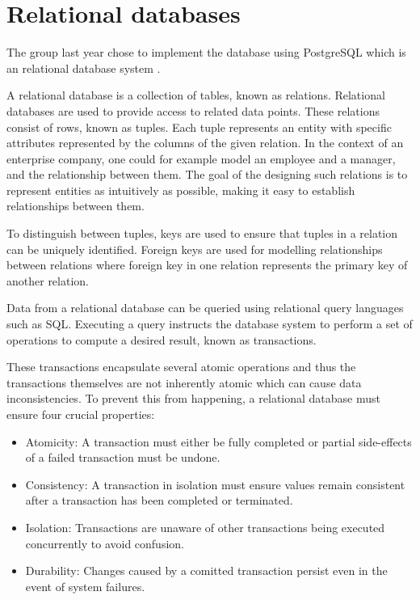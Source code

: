 \section{Relational databases}
The group last year chose to implement the database using PostgreSQL which is an relational database system .

A relational database is a collection of tables, known as relations. Relational databases are used to provide access to related data points.
These relations consist of rows, known as tuples. Each tuple represents an entity with specific attributes represented by the columns of the given relation.
In the context of an enterprise company, one could for example model an employee and a manager, and the relationship between them.
The goal of the designing such relations is to represent entities as intuitively as possible, making it easy to establish relationships between them. 

To distinguish between tuples, keys are used to ensure that tuples in a relation can be uniquely identified.
Foreign keys are used for modelling relationships between relations where foreign key in one relation represents the primary key of another relation.

Data from a relational database can be queried using relational query languages such as SQL.
Executing a query instructs the database system to perform a set of operations to compute a desired result, known as transactions.

These transactions encapsulate several atomic operations and thus the transactions themselves are not inherently atomic which can cause data inconsistencies. 
To prevent this from happening, a relational database must ensure four crucial properties:
\begin{itemize}
    \item Atomicity: A transaction must either be fully completed or partial side-effects of a failed transaction must be undone.
    \item Consistency: A transaction in isolation must ensure values remain consistent after a transaction has been completed or terminated.
    \item Isolation: Transactions are unaware of other transactions being executed concurrently to avoid confusion.
    \item Durability: Changes caused by a comitted transaction persist even in the event of system failures.
\end{itemize}

